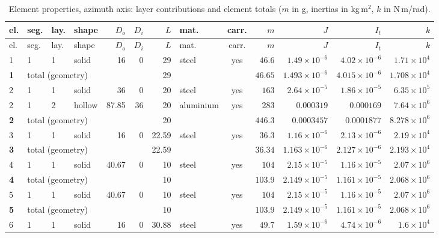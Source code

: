 \documentclass[10pt,a4paper]{article}
\numberwithin{equation}{section}
\begin{document}
\begin{longtable}{llllrrrlcrrrr}
\caption{Element properties, azimuth axis: layer contributions and element totals ($m$ in g, inertias in kg\,m$^2$, $k$ in N\,m/rad).}\\
\toprule
el. & seg. & lay. & shape & $D_o$ & $D_i$ & $L$ & mat. & carr. & $m$ & $J$ & $I_t$ & $k$ \\
\midrule\endfirsthead
\toprule el. & seg. & lay. & shape & $D_o$ & $D_i$ & $L$ & mat. & carr. & $m$ & $J$ & $I_t$ & $k$ \\ \midrule\endhead
1 & 1 & 1 & solid & 16 & 0 & 29 & steel & yes & $46.6$ & $1.49\times10^{-6}$ & $4.02\times10^{-6}$ & $1.71\times10^{4}$ \\
\midrule \textbf{1} & \multicolumn{5}{l}{total (geometry)} & 29 & & & $46.65$ & $1.493\times10^{-6}$ & $4.015\times10^{-6}$ & $1.708\times10^{4}$ \\ \midrule
2 & 1 & 1 & solid & 36 & 0 & 20 & steel & yes & $163$ & $2.64\times10^{-5}$ & $1.86\times10^{-5}$ & $6.35\times10^{5}$ \\
2 & 1 & 2 & hollow & 87.85 & 36 & 20 & aluminium & yes & $283$ & $0.000319$ & $0.000169$ & $7.64\times10^{6}$ \\
\midrule \textbf{2} & \multicolumn{5}{l}{total (geometry)} & 20 & & & $446.3$ & $0.0003457$ & $0.0001877$ & $8.278\times10^{6}$ \\ \midrule
3 & 1 & 1 & solid & 16 & 0 & 22.59 & steel & yes & $36.3$ & $1.16\times10^{-6}$ & $2.13\times10^{-6}$ & $2.19\times10^{4}$ \\
\midrule \textbf{3} & \multicolumn{5}{l}{total (geometry)} & 22.59 & & & $36.34$ & $1.163\times10^{-6}$ & $2.127\times10^{-6}$ & $2.193\times10^{4}$ \\ \midrule
4 & 1 & 1 & solid & 40.67 & 0 & 10 & steel & yes & $104$ & $2.15\times10^{-5}$ & $1.16\times10^{-5}$ & $2.07\times10^{6}$ \\
\midrule \textbf{4} & \multicolumn{5}{l}{total (geometry)} & 10 & & & $103.9$ & $2.149\times10^{-5}$ & $1.161\times10^{-5}$ & $2.068\times10^{6}$ \\ \midrule
5 & 1 & 1 & solid & 40.67 & 0 & 10 & steel & yes & $104$ & $2.15\times10^{-5}$ & $1.16\times10^{-5}$ & $2.07\times10^{6}$ \\
\midrule \textbf{5} & \multicolumn{5}{l}{total (geometry)} & 10 & & & $103.9$ & $2.149\times10^{-5}$ & $1.161\times10^{-5}$ & $2.068\times10^{6}$ \\ \midrule
6 & 1 & 1 & solid & 16 & 0 & 30.88 & steel & yes & $49.7$ & $1.59\times10^{-6}$ & $4.74\times10^{-6}$ & $1.6\times10^{4}$ \\

\end{longtable}
\end{document}
